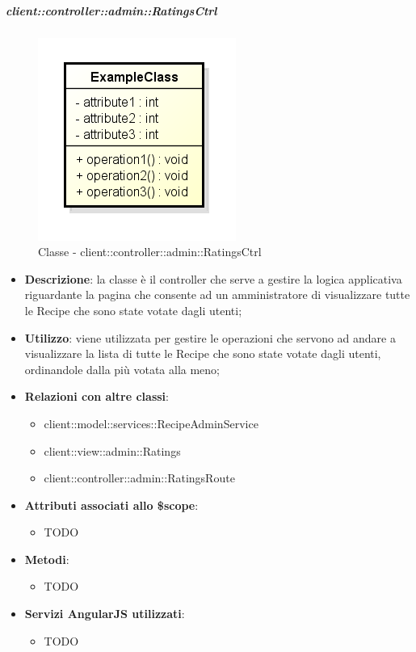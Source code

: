 		\subparagraph{client::controller::admin::RatingsCtrl} %
		\label{subp:bdsm_app_client_controller_admin_ratingsctrl}
			\begin{figure}[htbp]
				\centering
				\centerline{\includegraphics[scale=0.7]{./images/client/classes/example_class.png}}
				\caption{Classe - client::controller::admin::RatingsCtrl}
			\end{figure}
			\begin{itemize}
				\item \textbf{Descrizione}: la classe è il controller che serve a gestire la logica applicativa riguardante la pagina che consente ad un amministratore di visualizzare tutte le Recipe che sono state votate dagli utenti;
				\item \textbf{Utilizzo}: viene utilizzata per gestire le operazioni che servono ad andare a visualizzare la lista di tutte le Recipe che sono state votate dagli utenti, ordinandole dalla più votata alla meno;
				\item \textbf{Relazioni con altre classi}:
					\begin{itemize}
						\item client::model::services::RecipeAdminService
						\item client::view::admin::Ratings
						\item client::controller::admin::RatingsRoute
					\end{itemize}

				\item \textbf{Attributi associati allo \$scope}:
					\begin{itemize}
						\item TODO
					\end{itemize}

				\item \textbf{Metodi}:
					\begin{itemize}
						\item TODO
					\end{itemize}

				\item \textbf{Servizi AngularJS utilizzati}:
					\begin{itemize}
						\item TODO
					\end{itemize}

			\end{itemize}

